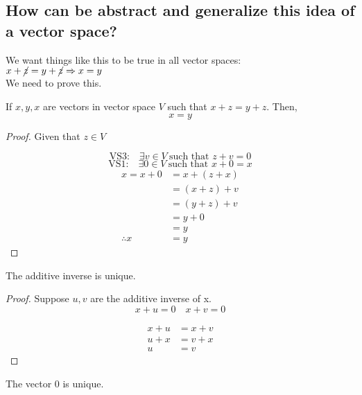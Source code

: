 \documentclass[11pt]{scrartcl}
\makeatletter
\newenvironment{Dequation}
  {%
  \def\tagform@##1{%
    \maketag@@@{\makebox[0pt][r]{(\ignorespaces##1\unskip\@@italiccorr)}}}%
  \ignorespaces
  }
  {%
  \def\tagform@##1{\maketag@@@{(\ignorespaces##1\unskip\@@italiccorr)}}%
  \ignorespacesafterend
  }
\makeatother
\begin{document}
\subsection{How can be abstract and generalize this idea of a vector space?}
We want things like this to be true in all vector spaces:\\
$x + \cancel{z} = y + \cancel{z} \Rightarrow x = y$\\
We need to prove this.
\begin{theorem*}
	If $x, y, x$ are vectors in vector space $V$ such that $x + z = y + z$. Then, 
	\[ x = y \]
\end{theorem*}
\begin{proof}
	Given that $z \in V$ 
	
	\[\text{VS3:} \quad \exists v \in V  \ \text{such that } z + v = 0 \]
	\[\text{VS1:} \quad \exists 0 \in V  \ \text{such that } x + 0 = x \]
	\begin{align*}
		x = x + 0 & = x + (z + x) \\
	& = (x + z) + v \\
	& = (y + z) + v \\
	& = y + 0 \\
	& = y \\
		\therefore x & = y
	\end{align*}
\end{proof}

\begin{corollary*}
	The additive inverse is unique.
\end{corollary*}

\begin{proof}
Suppose $u,v$ are the additive inverse of x.
\[x + u = 0 \quad x + v = 0\]
\begin{Dequation}
\begin{align*}
	x + u & = x + v \tag{Transitive property}\\ 
	u + x & = v + x \tag{Commutative property}\\
	u & = v \tag{Theorem 1.1}
\end{align*}
\end{Dequation}
\end{proof}

\begin{corollary*}
	The vector $0$ is unique.
\end{corollary*}
\end{document}
